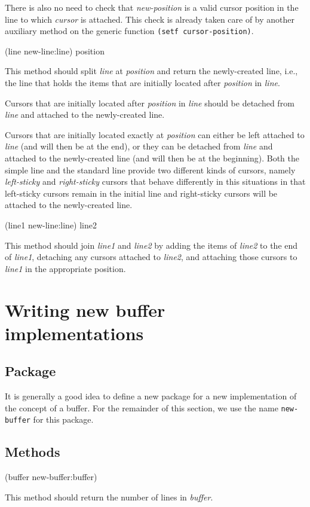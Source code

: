 There is also no need to check that \textit{new-position} is a valid
cursor position in the line to which \textit{cursor} is attached.
This check is already taken care of by another auxiliary method on the
generic function \texttt{(setf cursor-position)}.

 {(line new-line:line) position}

This method should split \textit{line} at \textit{position} and return
the newly-created line, i.e., the line that holds the items that are
initially located after \textit{position} in \textit{line}.

Cursors that are initially located after \textit{position} in
\textit{line} should be detached from \textit{line} and attached to
the newly-created line.

Cursors that are initially located exactly at \textit{position} can
either be left attached to \textit{line} (and will then be at the
end), or they can be detached from \textit{line} and attached to the
newly-created line (and will then be at the beginning).  Both the
simple line  and the standard
line  provide two different
kinds of cursors, namely \emph{left-sticky} and \emph{right-sticky}
cursors that behave differently in this situations in that left-sticky
cursors remain in the initial line and right-sticky cursors will be
attached to the newly-created line.

 {(line1 new-line:line) line2}

This method should join \textit{line1} and \textit{line2} by adding
the items of \textit{line2} to the end of \textit{line1}, detaching
any cursors attached to \textit{line2}, and attaching those cursors to
\textit{line1} in the appropriate position.

\section{Writing new buffer implementations}

\subsection{Package}

It is generally a good idea to define a new package for a new
implementation of the concept of a buffer.  For the remainder of this
section, we use the name \texttt{new-buffer} for this package.

\subsection{Methods}

 {(buffer new-buffer:buffer)}

This method should return the number of lines in \textit{buffer}.

